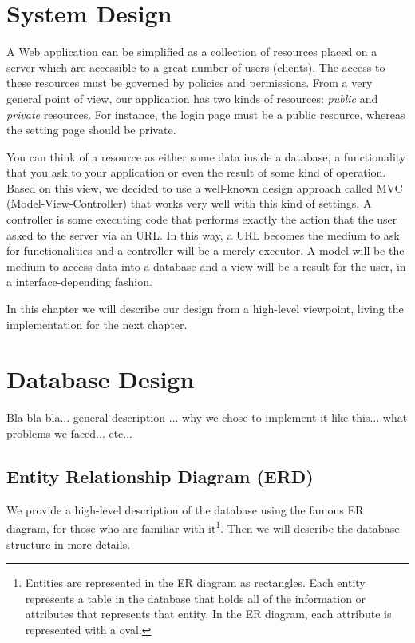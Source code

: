 \documentclass[12pt]{report}
\begin{document}
\section{System Design}
A Web application can be simplified as a collection of resources placed on a server which are accessible to a great number of users (clients). The access to these resources must be governed by policies and permissions. From a very general point of view, our application has two kinds of resources: \emph{public} and \emph{private} resources. For instance, the login page must be a public resource, whereas the setting page should be private.

You can think of a resource as either some data inside a database, a functionality that you ask to your application or even the result of some kind of operation. Based on this view, we decided to use a well-known design approach called MVC (Model-View-Controller) that works very well with this kind of settings. A controller is some executing code that performs exactly the action that the user asked to the server via an URL. In this way, a URL becomes the medium to ask for functionalities and a controller will be a merely executor. A model will be the medium to access data into a database and a view will be a result for the user, in a interface-depending fashion.

In this chapter we will describe our design from a high-level viewpoint, living the implementation for the next chapter.

\section{Database Design}
Bla bla bla... general description ... why we chose to implement it like this... what problems we faced... etc...

\subsection{Entity Relationship Diagram (ERD)}
We provide a high-level description of the database using the famous ER diagram, for those who are familiar with it\footnote{Entities are represented in the ER diagram as rectangles.  Each entity represents a table in the database that holds all of the information or attributes that represents that entity.  In the ER diagram, each attribute is represented with a oval.}. Then we will describe the database structure in more details.
\end{document}
